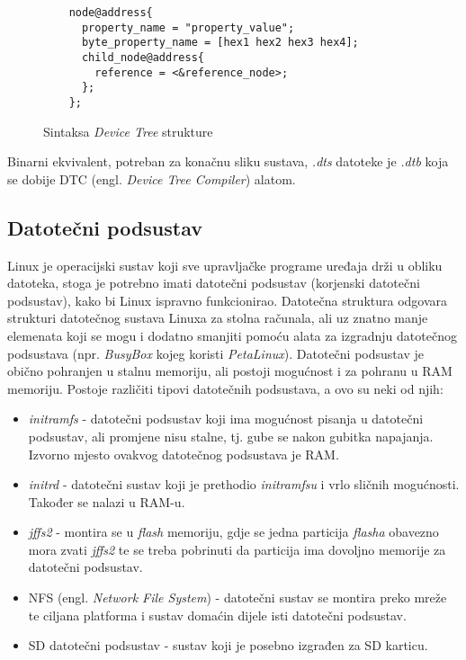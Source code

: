 \documentclass[times, utf8, diplomski, numeric]{fer}
\begin{document}
\begin{figure}[H]
  \centering
  \lstset{xleftmargin=.1\textwidth}
  \begin{lstlisting}
    node@address{
      property_name = "property_value";
      byte_property_name = [hex1 hex2 hex3 hex4];
      child_node@address{
        reference = <&reference_node>;
      };
    };
  \end{lstlisting}
  \caption{Sintaksa \textit{Device Tree} strukture}
  \label{devtree_sintax}
\end{figure}

Binarni ekvivalent, potreban za konačnu sliku sustava, \textit{.dts} datoteke je \textit{.dtb} koja se dobije DTC (engl.
\textit{Device Tree Compiler}) alatom.

\subsection{Datotečni podsustav}
Linux je operacijski sustav koji sve upravljačke programe uređaja drži u obliku datoteka, stoga je potrebno imati datotečni
podsustav (korjenski datotečni podsustav), kako bi Linux ispravno funkcionirao. Datotečna struktura odgovara strukturi
datotečnog sustava Linuxa za stolna računala, ali uz znatno manje elemenata koji se mogu i dodatno smanjiti pomoću alata
za izgradnju datotečnog podsustava (npr. \textit{BusyBox} kojeg koristi \textit{PetaLinux}). Datotečni podsustav je obično
pohranjen u stalnu memoriju, ali postoji mogućnost i za pohranu u RAM memoriju.
Postoje različiti tipovi datotečnih podsustava, a ovo su neki od njih:
\begin{itemize}
  \item{\textit{initramfs} - datotečni podsustav koji ima mogućnost pisanja u datotečni podsustav, ali promjene nisu stalne,
  tj. gube se nakon gubitka napajanja. Izvorno mjesto ovakvog datotečnog podsustava je RAM.}
  \item{\textit{initrd} - datotečni sustav koji je prethodio \textit{initramfsu} i vrlo sličnih mogućnosti. Također se nalazi
  u RAM-u.}
  \item{\textit{jffs2} - montira se u \textit{flash} memoriju, gdje se jedna particija \textit{flasha} obavezno mora zvati
  \textit{jffs2} te se treba pobrinuti da particija ima dovoljno memorije za datotečni podsustav.}
  \item{NFS (engl. \textit{Network File System}) - datotečni sustav se montira preko mreže te ciljana platforma i sustav
  domaćin dijele isti datotečni podsustav.}
  \item{SD datotečni podsustav - sustav koji je posebno izgrađen za SD karticu.}
\end{itemize}
\end{document}
